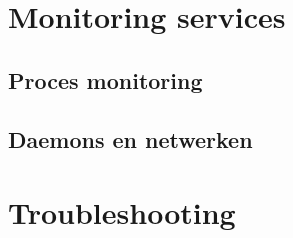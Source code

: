 \documentclass[a4paper,12pt,twoside,openright,titlepage]{book}
\begin{document}
\chapter{Monitoring services}

\section{Proces monitoring}

\section{Daemons en netwerken}


\chapter{Troubleshooting}


\printindex
\end{document}
